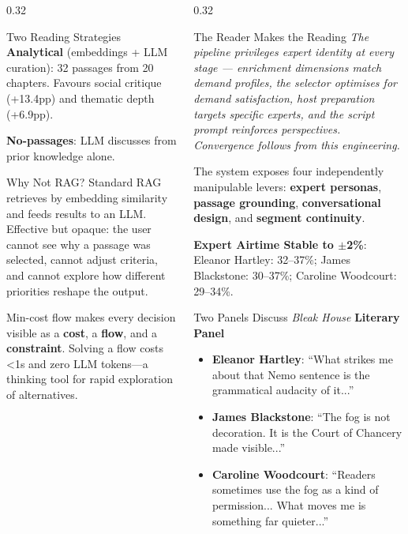 \documentclass[final]{beamer}
\begin{document}
\begin{frame}[t]
\begin{columns}[t]
\begin{column}{0.32\textwidth}
\begin{block}{Two Reading Strategies}
    \textbf{Analytical} (embeddings + LLM curation): 32 passages from 20 chapters. Favours social critique (+13.4pp) and thematic depth (+6.9pp).

    \textbf{No-passages}: LLM discusses from prior knowledge alone.
\end{block}

\begin{block}{Why Not RAG?}
    Standard RAG retrieves by embedding similarity and feeds results to an LLM. Effective but opaque: the user cannot see why a passage was selected, cannot adjust criteria, and cannot explore how different priorities reshape the output.

    Min-cost flow makes every decision visible as a \textbf{cost}, a \textbf{flow}, and a \textbf{constraint}. Solving a flow costs <1s and zero LLM tokens---a thinking tool for rapid exploration of alternatives.
\end{block}

\end{column}

\begin{column}{0.32\textwidth}

\begin{block}{The Reader Makes the Reading}
    \textit{The pipeline privileges expert identity at every stage --- enrichment dimensions match demand profiles, the selector optimises for demand satisfaction, host preparation targets specific experts, and the script prompt reinforces perspectives. Convergence follows from this engineering.}

    The system exposes four independently manipulable levers: \textbf{expert personas}, \textbf{passage grounding}, \textbf{conversational design}, and \textbf{segment continuity}.

    \vspace{5pt}
    \textbf{Expert Airtime Stable to $\pm$2\%}:
    Eleanor Hartley: 32--37\%; James Blackstone: 30--37\%; Caroline Woodcourt: 29--34\%.
\end{block}

\begin{block}{Two Panels Discuss \textit{Bleak House}}
    \textbf{Literary Panel}
    \begin{itemize}
        \item \textbf{Eleanor Hartley}: ``What strikes me about that Nemo sentence is the grammatical audacity of it...''
        \item \textbf{James Blackstone}: ``The fog is not decoration. It is the Court of Chancery made visible...''
        \item \textbf{Caroline Woodcourt}: ``Readers sometimes use the fog as a kind of permission... What moves me is something far quieter...''
    \end{itemize}


\end{block}
\end{column}
\end{columns}
\end{frame}
\end{document}
